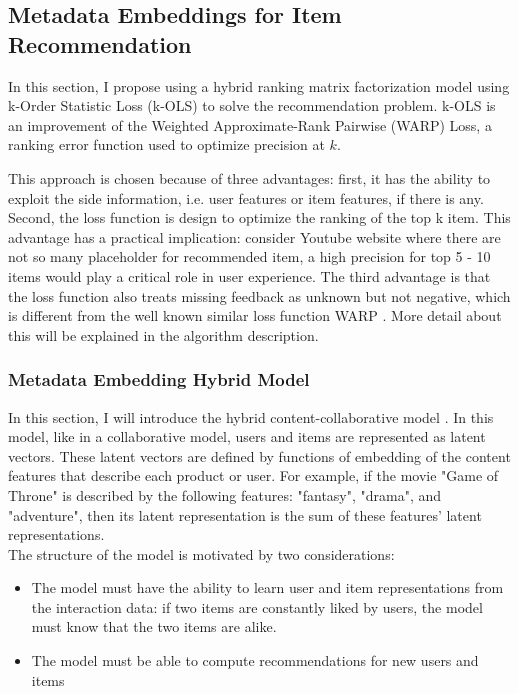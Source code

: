 \subsection{Metadata Embeddings for Item Recommendation}
In this section, I propose using a hybrid ranking matrix factorization model using k-Order Statistic Loss (k-OLS) to solve the recommendation problem. k-OLS is an improvement of the Weighted Approximate-Rank Pairwise (WARP) Loss, a ranking error function used to optimize precision at \(k\). 

This approach is chosen because of three advantages: first, it has the ability to exploit the side information, i.e. user features or item features, if there is any. Second, the loss function is design to optimize the ranking of the top k item. This advantage has a practical implication: consider Youtube website where there are not so many placeholder for recommended item, a high precision for top 5 - 10 items would play a critical role in user experience. The third advantage is that the loss function also treats missing feedback as unknown but not negative, which is different from the well known similar loss function WARP \cite{weston2011wsabie}. More detail about this will be explained in the algorithm description.

\subsubsection{Metadata Embedding Hybrid Model}

In this section, I will introduce the hybrid content-collaborative model \cite{kula2015metadata}. In this model, like in a collaborative model, users and items are represented as latent vectors. These latent vectors are defined by functions of embedding of the content features that describe each product or user. For example, if the movie "Game of Throne" is described by the following features: "fantasy", "drama", and "adventure", then its latent representation is the sum of these features' latent representations.\\

\noindent The structure of the model is motivated by two considerations:

\begin{itemize}
	\item The model must have the ability to learn user and item representations from the interaction data: if two items are constantly liked by users, the model must know that the two items are alike.
	\item The model must be able to compute recommendations for new users and items
\end{itemize}

